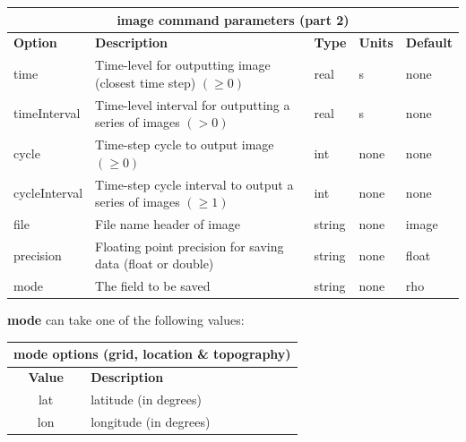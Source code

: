 \documentclass[11pt]{report}
\begin{document}
{\begin{center}
	\begin{tabular}{|l|p{8cm}|l|l|l|} \hline
		\multicolumn{5}{|c|}{\bf image command parameters (part 2)}                                                              \\ \hline
		\bf{Option}   & \bf{Description}                                                 & \bf{Type} & \bf{Units} & \bf{Default} \\
		\hline \hline
		time          & Time-level for outputting image (closest time step) $(\geq 0)$   & real      & s          & none         \\ \hline
		timeInterval  & Time-level interval for outputting a series of images $(> 0)$    & real      & s          & none         \\ \hline
		cycle         & Time-step cycle to output image $(\geq 0)$                       & int       & none       & none         \\ \hline
		cycleInterval & Time-step cycle interval to output a series of images $(\geq 1)$ & int       & none       & none         \\ \hline\hline
		file          & File name header of image                                        & string    & none       & image        \\ \hline
		precision     & Floating point precision for saving data (float or double)       & string    & none       & float        \\ \hline
		mode          & The field to be saved                                            & string    & none       & rho          \\ \hline
	\end{tabular}
\end{center}
%
{\bf mode} can take one of the following values:
%
\begin{center}
	\begin{tabular}{|c|l|} \hline
		\multicolumn{2}{|c|}{\bf mode options (grid, location \& topography)}                          \\ \hline
		\bf{Value} & \bf{Description}                                                                  \\
		\hline  \hline
		lat        & latitude (in degrees)                                                             \\ \hline
		lon        & longitude (in degrees)                                                            \\ \hline

\end{tabular}
\end{center}}
\end{document}
